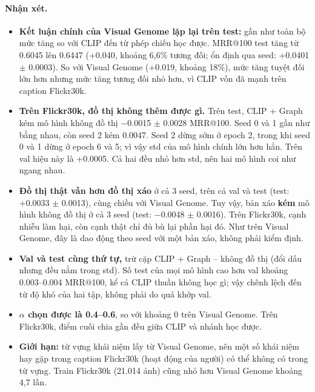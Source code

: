 \documentclass[12pt, a4paper]{article}
\makeatletter
\newcommand{\mrr}{MRR@100}
\newcommand{\pmm}{\ensuremath{\pm}}
\makeatother
\begin{document}
\paragraph{Nhận xét.}
\begin{itemize}
\item \textbf{Kết luận chính của Visual Genome lặp lại trên test:} gần như toàn bộ mức tăng so với CLIP đến từ phép chiếu học được. \mrr{} test tăng từ 0.6045 lên 0.6447 (+0.040, khoảng 6,6\% tương đối; ổn định qua seed: +0.0401 \pmm{} 0.0003). So với Visual Genome (+0.019, khoảng 18\%), mức tăng tuyệt đối lớn hơn nhưng mức tăng tương đối nhỏ hơn, vì CLIP vốn đã mạnh trên caption Flickr30k.
\item \textbf{Trên Flickr30k, đồ thị không thêm được gì.} Trên test, CLIP + Graph kém mô hình không đồ thị $-$0.0015 \pmm{} 0.0028 \mrr. Seed 0 và 1 gần như bằng nhau, còn seed 2 kém 0.0047. Seed 2 dừng sớm ở epoch 2, trong khi seed 0 và 1 dừng ở epoch 6 và 5; vì vậy std của mô hình chính lớn hơn hẳn. Trên val hiệu này là +0.0005. Cả hai đều nhỏ hơn std, nên hai mô hình coi như ngang nhau.
\item \textbf{Đồ thị thật vẫn hơn đồ thị xáo} ở cả 3 seed, trên cả val và test (test: +0.0033 \pmm{} 0.0013), cùng chiều với Visual Genome. Tuy vậy, bản xáo \textbf{kém} mô hình không đồ thị ở cả 3 seed (test: $-$0.0048 \pmm{} 0.0016). Trên Flickr30k, cạnh nhiễu làm hại, còn cạnh thật chỉ đủ bù lại phần hại đó. Như trên Visual Genome, đây là dao động theo seed với một bản xáo, không phải kiểm định.
\item \textbf{Val và test cùng thứ tự,} trừ cặp CLIP + Graph -- không đồ thị (đổi dấu nhưng đều nằm trong std). Số test của mọi mô hình cao hơn val khoảng 0.003--0.004 \mrr, kể cả CLIP thuần không học gì; vậy chênh lệch đến từ độ khó của hai tập, không phải do quá khớp val.
\item \textbf{$\alpha$ chọn được là 0.4--0.6}, so với khoảng 0 trên Visual Genome. Trên Flickr30k, điểm cuối chia gần đều giữa CLIP và nhánh học được.
\item \textbf{Giới hạn:} từ vựng khái niệm lấy từ Visual Genome, nên một số khái niệm hay gặp trong caption Flickr30k (hoạt động của người) có thể không có trong từ vựng. Train Flickr30k (21.014 ảnh) cũng nhỏ hơn Visual Genome khoảng 4,7 lần.
\end{itemize}
\end{document}
